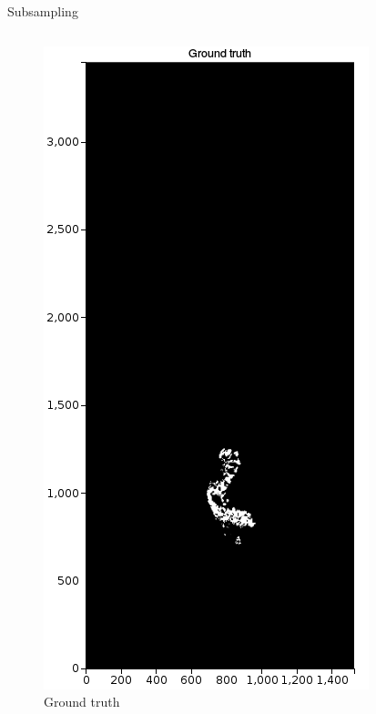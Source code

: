 \documentclass{beamer}
\begin{document}
\begin{frame}[noframenumbering]{Subsampling}
\begin{columns}[T]
\begin{column}{.25\textwidth}
\begin{figure}[!ht]
\centering
\includegraphics[width=\textwidth]{GT.png}
\caption{Ground truth}
\label{}
\end{figure}
\end{column}%
\begin{column}{.25\textwidth}

\end{column}
\end{columns}
\end{frame}
\end{document}
